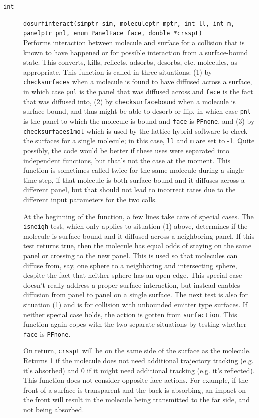 \documentclass {scrbook}
\newcommand {\ttt} {\texttt}
\begin{document}
\begin{description}
\item[\ttt{int}]
\ttt{dosurfinteract(simptr sim, moleculeptr mptr, int ll, int m, panelptr pnl, enum PanelFace face, double *crsspt)}
\hfill \\
Performs interaction between molecule and surface for a collision that is known to have happened or for possible interaction from a surface-bound state. This converts, kills, reflects, adsorbs, desorbs, etc. molecules, as appropriate. This function is called in three situations: (1) by \ttt{checksurfaces} when a molecule is found to have diffused across a surface, in which case \ttt{pnl} is the panel that was diffused across and \ttt{face} is the fact that was diffused into, (2) by \ttt{checksurfacebound} when a molecule is surface-bound, and thus might be able to desorb or flip, in which case \ttt{pnl} is the panel to which the molecule is bound and \ttt{face} is \ttt{PFnone}, and (3) by \ttt{checksurfaces1mol} which is used by the lattice hybrid software to check the surfaces for a single molecule; in this case, \ttt{ll} and \ttt{m} are set to -1. Quite possibly, the code would be better if these uses were separated into independent functions, but that's not the case at the moment. This function is sometimes called twice for the same molecule during a single time step, if that molecule is both surface-bound and it diffuses across a different panel, but that should not lead to incorrect rates due to the different input parameters for the two calls.

At the beginning of the function, a few lines take care of special cases. The \ttt{isneigh} test, which only applies to situation (1) above, determines if the molecule is surface-bound and it diffused across a neighboring panel. If this test returns true, then the molecule has equal odds of staying on the same panel or crossing to the new panel. This is used so that molecules can diffuse from, say, one sphere to a neighboring and intersecting sphere, despite the fact that neither sphere has an open edge. This special case doesn't really address a proper surface interaction, but instead enables diffusion from panel to panel on a single surface. The next test is also for situation (1) and is for collision with unbounded emitter type surfaces. If neither special case holds, the action is gotten from \ttt{surfaction}. This function again copes with the two separate situations by testing whether \ttt{face} is \ttt{PFnone}.

On return, \ttt{crsspt} will be on the same side of the surface as the molecule. Returns 1 if the molecule does not need additional trajectory tracking (e.g. it's absorbed) and 0 if it might need additional tracking (e.g. it's reflected). This function does not consider opposite-face actions. For example, if the front of a surface is transparent and the back is absorbing, an impact on the front will result in the molecule being transmitted to the far side, and not being absorbed.


\end{description}
\end{document}
